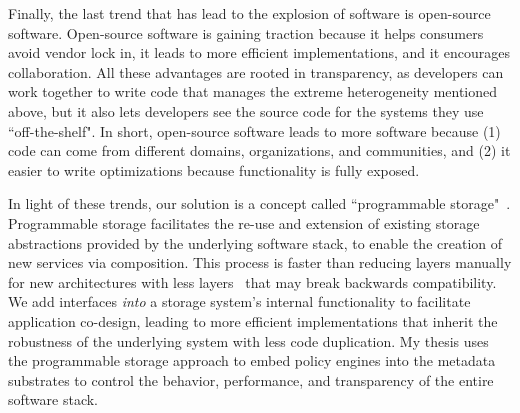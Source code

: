 Finally, the last trend that has lead to the explosion of software is
open-source software. Open-source software is gaining traction because it helps
consumers avoid vendor lock in, it leads to more efficient implementations, and
it encourages collaboration. All these advantages are rooted in transparency,
as developers can work together to write code that manages the extreme
heterogeneity mentioned above, but it also lets developers see the source code
for the systems they use ``off-the-shelf". In short, open-source software leads
to more software because (1) code can come from different domains,
organizations, and communities, and (2) it easier to write optimizations
because functionality is fully exposed.

In light of these trends, our solution is a concept called ``programmable
storage"~\cite{sevilla:eurosys17-malacology, watkins:hot17-declstor}.
Programmable storage facilitates the re-use and extension of existing storage
abstractions provided by the underlying software stack, to enable the creation
of new services via composition. This process is faster than reducing layers
manually for new architectures with less layers~\cite{bent:login16-hpc-trends}
that may break backwards compatibility.  We add interfaces {\it into} a storage
system's internal functionality to facilitate application co-design, leading to
more efficient implementations that inherit the robustness of the underlying
system with less code duplication. My thesis uses the programmable storage
approach to embed policy engines into the metadata substrates to control the
behavior, performance, and transparency of the entire software stack.

